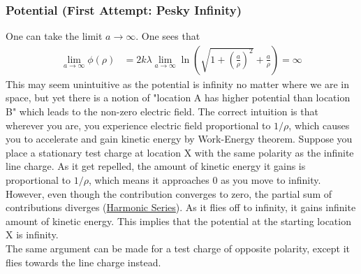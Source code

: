 \documentclass{article}
\begin{document}
\subsubsection{Potential (First Attempt: Pesky Infinity)}
One can take the limit $a\rightarrow\infty$. One sees that 
\begin{align}
    \lim_{a\rightarrow\infty}\phi(\rho)&=2 k \lambda  \lim_{a\rightarrow\infty}\ln \left(\sqrt{1+\left(\frac{a}{\rho}\right)^2}+\frac{a}{\rho}\right) = \infty 
\end{align}
This may seem unintuitive as the potential is infinity no matter where we are in space, but yet there is a notion of "location A has higher potential than location B" which leads to the non-zero electric field. The correct intuition is that wherever you are, you experience electric field proportional to $1/\rho$, which causes you to accelerate and gain kinetic energy by Work-Energy theorem. Suppose you place a stationary test charge at location X with the same polarity as the infinite line charge. As it get repelled, the amount of kinetic energy it gains is proportional to $1/\rho$, which means it approaches $0$ as you move to infinity. However, even though the contribution converges to zero, the partial sum of contributions diverges (\href{https://en.wikipedia.org/wiki/Harmonic_series_(mathematics)}{Harmonic Series}). As it flies off to infinity, it gains infinite amount of kinetic energy. This implies that the potential at the starting location X is infinity. \\[10pt]
The same argument can be made for a test charge of opposite polarity, except it flies towards the line charge instead.
\end{document}
